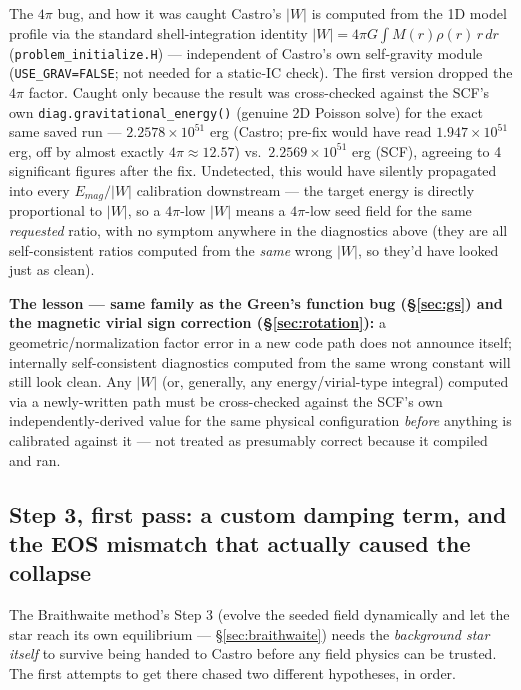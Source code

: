 \documentclass[11pt,a4paper]{scrartcl}
\newcommand{\code}[1]{\texttt{\small #1}}
\begin{document}
\begin{notebox}{The \texorpdfstring{$4\pi$}{4pi} bug, and how it was caught}
Castro's $|W|$ is computed from the 1D model profile via the standard
shell-integration identity $|W|=4\pi G\int M(r)\rho(r)\,r\,dr$
(\code{problem\_initialize.H}) --- independent of Castro's own
self-gravity module (\code{USE\_GRAV=FALSE}; not needed for a
static-IC check). The first version dropped the $4\pi$ factor. Caught
only because the result was cross-checked against the SCF's own
\code{diag.gravitational\_energy()} (genuine 2D Poisson solve) for the
exact same saved run --- $2.2578\times10^{51}$ erg (Castro; pre-fix
would have read $1.947\times10^{51}$ erg, off by almost exactly
$4\pi\approx12.57$) vs.\ $2.2569\times10^{51}$ erg (SCF), agreeing to 4
significant figures after the fix. Undetected, this would have silently
propagated into every $E_{mag}/|W|$ calibration downstream --- the
target energy is directly proportional to $|W|$, so a $4\pi$-low $|W|$
means a $4\pi$-low seed field for the same \emph{requested} ratio, with
no symptom anywhere in the diagnostics above (they are all
self-consistent ratios computed from the \emph{same} wrong $|W|$, so
they'd have looked just as clean).

\textbf{The lesson --- same family as the Green's function bug
(\S\ref{sec:gs}) and the magnetic virial sign correction
(\S\ref{sec:rotation}):} a geometric/normalization factor error in a new
code path does not announce itself; internally self-consistent
diagnostics computed from the same wrong constant will still look
clean. Any $|W|$ (or, generally, any energy/virial-type integral)
computed via a newly-written path must be cross-checked against the
SCF's own independently-derived value for the same physical
configuration \emph{before} anything is calibrated against it --- not
treated as presumably correct because it compiled and ran.
\end{notebox}

\subsection{Step 3, first pass: a custom damping term, and the EOS mismatch that actually caused the collapse}
\label{sec:damping-eos}

The Braithwaite method's Step 3 (evolve the seeded field dynamically and
let the star reach its own equilibrium --- \S\ref{sec:braithwaite})
needs the \emph{background star itself} to survive being handed to
Castro before any field physics can be trusted. The first attempts to
get there chased two different hypotheses, in order.
\end{document}
